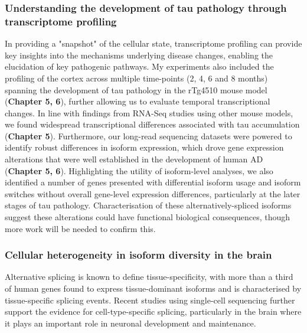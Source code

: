 \subsubsection{Understanding the development of tau pathology through transcriptome profiling}
In providing a "snapshot" of the cellular state, transcriptome profiling can provide key insights into the mechanisms underlying disease changes, enabling the elucidation of key pathogenic pathways. My experiments also included the profiling of the cortex across multiple time-points (2, 4, 6 and 8 months) spanning the development of tau pathology in the rTg4510 mouse model (\textbf{Chapter 5, 6}), further allowing us to evaluate temporal transcriptional changes. In line with findings from RNA-Seq studies using other mouse models, we found widespread transcriptional differences associated with tau accumulation (\textbf{Chapter 5}). Furthermore, our long-read sequencing datasets were powered to identify robust differences in isoform expression, which drove gene expression alterations that were well established in the development of human AD (\textbf{Chapter 5, 6}). Highlighting the utility of isoform-level analyses, we also identified a number of genes presented with differential isoform usage and isoform switches without overall gene-level expression differences, particularly at the later stages of tau pathology. Characterisation of these alternatively-spliced isoforms suggest these alterations could have functional biological consequences, though more work will be needed to confirm this.   

\subsubsection{Cellular heterogeneity in isoform diversity in the brain}
Alternative splicing is known to define tissue-specificity, with more than a third of human genes found to express tissue-dominant isoforms and is characterised by tissue-specific splicing events\cite{Wang2008,Yeo2004}. Recent studies using single-cell sequencing further support the evidence for cell-type-specific splicing, particularly in the brain where it plays an important role in neuronal development and maintenance.

